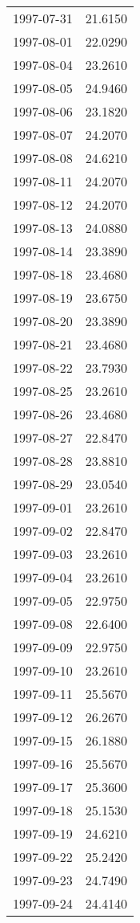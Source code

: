 \begin{tabular}{lr}
1997-07-31 &     21.6150 \\
1997-08-01 &     22.0290 \\
1997-08-04 &     23.2610 \\
1997-08-05 &     24.9460 \\
1997-08-06 &     23.1820 \\
1997-08-07 &     24.2070 \\
1997-08-08 &     24.6210 \\
1997-08-11 &     24.2070 \\
1997-08-12 &     24.2070 \\
1997-08-13 &     24.0880 \\
1997-08-14 &     23.3890 \\
1997-08-18 &     23.4680 \\
1997-08-19 &     23.6750 \\
1997-08-20 &     23.3890 \\
1997-08-21 &     23.4680 \\
1997-08-22 &     23.7930 \\
1997-08-25 &     23.2610 \\
1997-08-26 &     23.4680 \\
1997-08-27 &     22.8470 \\
1997-08-28 &     23.8810 \\
1997-08-29 &     23.0540 \\
1997-09-01 &     23.2610 \\
1997-09-02 &     22.8470 \\
1997-09-03 &     23.2610 \\
1997-09-04 &     23.2610 \\
1997-09-05 &     22.9750 \\
1997-09-08 &     22.6400 \\
1997-09-09 &     22.9750 \\
1997-09-10 &     23.2610 \\
1997-09-11 &     25.5670 \\
1997-09-12 &     26.2670 \\
1997-09-15 &     26.1880 \\
1997-09-16 &     25.5670 \\
1997-09-17 &     25.3600 \\
1997-09-18 &     25.1530 \\
1997-09-19 &     24.6210 \\
1997-09-22 &     25.2420 \\
1997-09-23 &     24.7490 \\
1997-09-24 &     24.4140 \\

\end{tabular}
